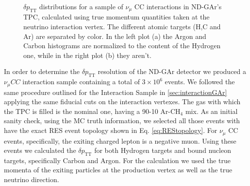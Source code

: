 \begin{figure}[!ht]
\begin{subfigure}[b]{0.48\textwidth}
         \caption{}
    \label{fig:MCunscaled_Targets}
     \end{subfigure}
        \caption{$\delta p_\text{TT}$ distributions for a sample of $\nu_\mu$ CC interactions in ND-GAr's TPC, calculated using true momentum quantities taken at the neutrino interaction vertex. The different atomic targets (H,C and Ar) are separated by color. In the left plot (a) the Argon and Carbon histograms are normalized to the content of the Hydrogen one, while in the right plot (b) they aren't. } \label{fig:MC_Targets}
\end{figure}

In order to determine the $\delta p_\text{TT}$ resolution of the ND-GAr detector we produced a $\nu_\mu CC$ interaction sample containing a total of $3\times10^6$ events. We followed the same procedure outlined for the Interaction Sample in \ref{sec:interactionGAr} applying the same fiducial cuts on the interaction vertexes. The gas with which the TPC is filled is the nominal one, having a 90-10 Ar-CH$_4$ mix. As an initial sanity check, using the MC truth information, we selected all those events with have the exact RES event topology shown in Eq. \ref{eq:REStopology}. For $\nu_\mu$ CC events, specifically, the exiting charged lepton is a negative muon. Using these events we calculated the $\delta p_\text{TT}$ for both Hydrogen targets and bound nucleon targets, specifically Carbon and Argon. For the calculation we used the true momenta of the exiting particles at the production vertex as well as the true neutrino direction. 
